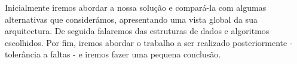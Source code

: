
Inicialmente iremos abordar a nossa solução e compará-la com algumas alternativas que considerámos, apresentando uma vista global da sua arquitectura. De seguida falaremos das estruturas de dados e algoritmos escolhidos. Por fim, iremos abordar o trabalho a ser realizado posteriormente - tolerância a faltas - e iremos fazer uma pequena conclusão.